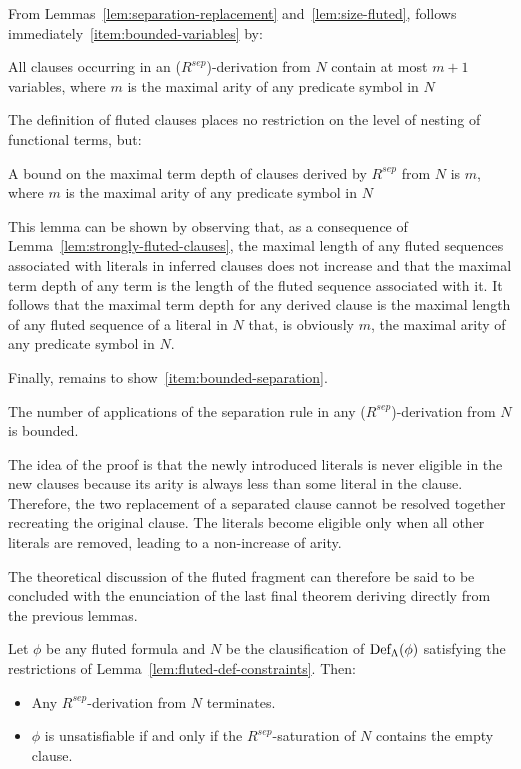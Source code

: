 From Lemmas~\ref{lem:separation-replacement} and~\ref{lem:size-fluted}, follows immediately~\ref{item:bounded-variables} by:
\begin{lemma}\label{lem:bounded-variables}
  All clauses occurring in an (\(R^{sep}\))-derivation from \(N\) contain at most \(m+1\) variables, where \(m\) is the maximal arity of any predicate symbol in \(N\)
\end{lemma}
The definition of fluted clauses places no restriction on the level of nesting of functional terms, but:
\begin{lemma}\label{lem:bounded-depth}
  A bound on the maximal term depth of clauses derived by \(R^{sep}\) from \(N\) is \(m\), where \(m\) is the maximal arity of any predicate symbol in \(N\)
\end{lemma}
This lemma can be shown by observing that, as a consequence of Lemma~\ref{lem:strongly-fluted-clauses}, the maximal length of any fluted sequences associated with literals in inferred clauses does not increase and that the maximal term depth of any term is the length of the fluted sequence associated with it.
It follows that the maximal term depth for any derived clause is the maximal length of any fluted sequence of a literal in \(N\) that, is obviously \(m\), the maximal arity of any predicate symbol in \(N\).

Finally, remains to show~\ref{item:bounded-separation}.
\begin{lemma}\label{lem:bounded-separation}
  The number of applications of the separation rule in any (\(R^{sep}\))-derivation from \(N\) is bounded.
\end{lemma}

The idea of the proof is that the newly introduced literals is never eligible in the new clauses because its arity is always less than some literal in the clause.
Therefore, the two replacement of a separated clause cannot be resolved together recreating the original clause. The literals become eligible only when all other  literals are removed, leading to a non-increase of arity.

The theoretical discussion of the fluted fragment can therefore be said to be concluded with the enunciation of the last final theorem deriving directly from the previous lemmas.

\begin{theorem}
  Let \(\phi\) be any fluted formula and \(N\) be the clausification of \(\fldef{\Lambda}{\phi}\) satisfying the restrictions of Lemma~\ref{lem:fluted-def-constraints}.
  Then:
  \begin{itemize}
    \item Any \(R^{sep}\)-derivation from \(N\) terminates.
    \item \(\phi\) is unsatisfiable if and only if the \(R^{sep}\)-saturation of \(N\) contains the empty clause.
  \end{itemize}
\end{theorem}

